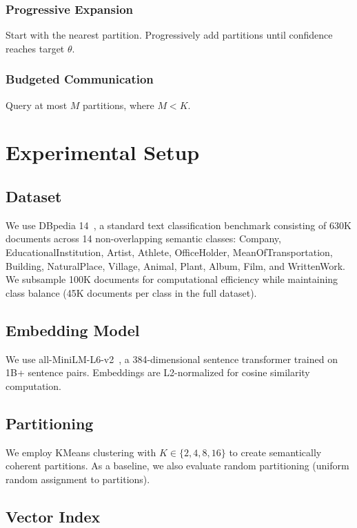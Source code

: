 \documentclass[10pt,twocolumn]{article}
\begin{document}
\subsubsection{Progressive Expansion}
Start with the nearest partition. Progressively add partitions until confidence reaches target $\theta$.

\subsubsection{Budgeted Communication}
Query at most $M$ partitions, where $M < K$.

\section{Experimental Setup}

\subsection{Dataset}

We use DBpedia 14~\cite{zhang2015character}, a standard text classification benchmark consisting of 630K documents across 14 non-overlapping semantic classes: Company, EducationalInstitution, Artist, Athlete, OfficeHolder, MeanOfTransportation, Building, NaturalPlace, Village, Animal, Plant, Album, Film, and WrittenWork. We subsample 100K documents for computational efficiency while maintaining class balance (45K documents per class in the full dataset).

\subsection{Embedding Model}

We use all-MiniLM-L6-v2~\cite{reimers2019sentence}, a 384-dimensional sentence transformer trained on 1B+ sentence pairs. Embeddings are L2-normalized for cosine similarity computation.

\subsection{Partitioning}

We employ KMeans clustering with $K \in \{2, 4, 8, 16\}$ to create semantically coherent partitions. As a baseline, we also evaluate random partitioning (uniform random assignment to partitions).

\subsection{Vector Index}
\end{document}
